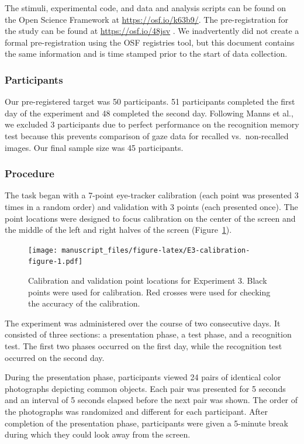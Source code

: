 \documentclass[
  man,floatsintext]{apa6}
\begin{document}
The stimuli, experimental code, and data and analysis scripts can be
found on the Open Science Framework at \url{https://osf.io/k63b9/}.
The pre-registration for the study can be
found at \url{https://osf.io/48jsv} . We
inadvertently did not create a formal pre-registration using the OSF
registries tool, but this document contains the same information and is
time stamped prior to the start of data collection.

\subsubsection{Participants}\label{participants-3}

Our pre-registered target was 50 participants. 51 participants completed
the first day of the experiment and 48 completed the second day.
Following Manns et al., we excluded 3 participants due to perfect
performance on the recognition memory test because this prevents
comparison of gaze data for recalled vs.~non-recalled images. Our final
sample size was 45 participants.

\subsubsection{Procedure}\label{procedure-2}

The task began with a 7-point eye-tracker calibration (each point was
presented 3 times in a random order) and validation with 3 points (each
presented once). The point locations were designed to focus calibration
on the center of the screen and the middle of the left and right halves
of the screen (Figure~\ref{fig:E3-calibration-figure}).

\begin{figure}
\centering
\texttt{[image: manuscript\_files/figure-latex/E3-calibration-figure-1.pdf]}
\caption{\label{fig:E3-calibration-figure}Calibration and validation point locations for Experiment 3. Black points were used for calibration. Red crosses were used for checking the accuracy of the calibration.}
\end{figure}

The experiment was administered over the course of two
consecutive days. It consisted of three sections: a presentation phase,
a test phase, and a recognition test. The first two phases occurred on
the first day, while the recognition test occurred on the second day.

During the presentation phase, participants viewed 24 pairs of identical
color photographs depicting common objects. Each pair was presented for
5 seconds and an interval of 5 seconds elapsed before the next pair was
shown. The order of the photographs was randomized and different for
each participant. After completion of the presentation phase,
participants were given a 5-minute break during which they could look
away from the screen.
\end{document}
